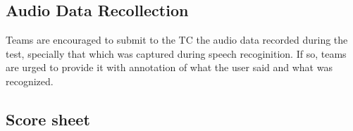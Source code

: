 \subsection {Audio Data Recollection}
Teams are encouraged to submit to the TC the audio data recorded during the test, specially that which was captured during speech recoginition. If so, teams are urged to provide it with annotation of what the user said and what was recognized.

\newpage
\subsection{Score sheet}


